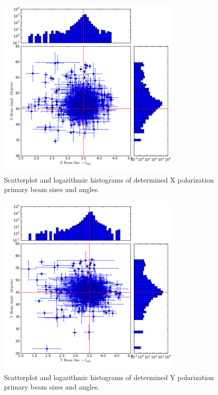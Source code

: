 \documentclass[preprint]{aastex}
\begin{document}
\begin{figure}[htb]
\begin{center}
\includegraphics[width=0.8\textwidth]{images/x_magangle}
\caption{Scatterplot and logarithmic histograms of determined X polarization primary beam sizes and angles. \label{fig.x_shape}}
\end{center}
\end{figure}

\begin{figure}[htb]
\begin{center}
\includegraphics[width=0.8\textwidth]{images/y_magangle}
\caption{Scatterplot and logarithmic histograms of determined Y polarization primary beam sizes and angles. \label{fig.y_shape}}
\end{center}
\end{figure}
\end{document}
